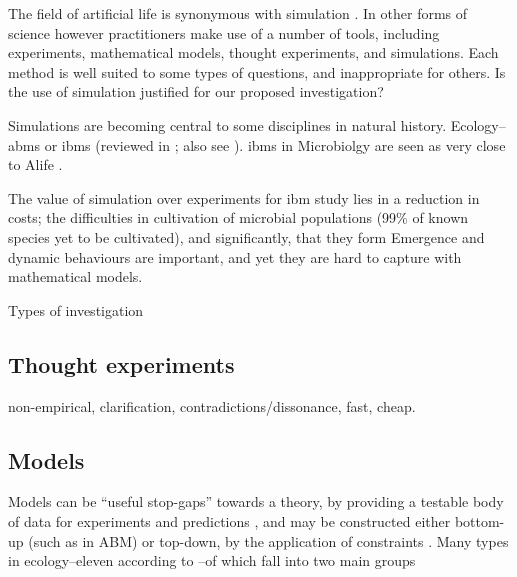 
The field of artificial life is synonymous with simulation
\autocite[chap.2]{Aicardi2010}. In other forms of science however
practitioners make use of a number of tools, including experiments,
mathematical models, thought experiments, and simulations.
Each method is well suited to some types of
questions, and inappropriate for others. Is the use of simulation
justified for our proposed investigation?

Simulations are becoming central to some disciplines in natural history.
Ecology--\glspl{abm} or \glspl{ibm} (reviewed in
\autocite{DeAngelis2005}; also see
\autocite{Grimm:2006fk,Grimm:2005wd,Grimm:1999kf,Hogeweg:1990jz}).
\glspl{ibm} in Microbiolgy are seen as very close to Alife \autocite{Grimm:2009th}.

The value of simulation over experiments for
\gls{ibm} study lies in a reduction in costs; the difficulties in
cultivation of microbial populations (99\% of known species yet to be
cultivated), and significantly, that they form  Emergence and
dynamic behaviours are important, and yet they are hard to capture with
mathematical models.

Types of investigation

\subsection{Thought experiments}\label{thought-experiments}

non-empirical, clarification, contradictions/dissonance, fast, cheap.

\subsection{Models}\label{models}


Models can be ``useful stop-gaps'' towards a theory, by providing a
testable body of data for experiments and predictions
\autocite{Krakauer2011}, and may be constructed either bottom-up (such
as in ABM) or top-down, by the application of constraints
\autocite{Krakauer2011}. Many types in \eg ecology--eleven according to
\autocite{Jorgensen2008}--of which fall into two main groups


